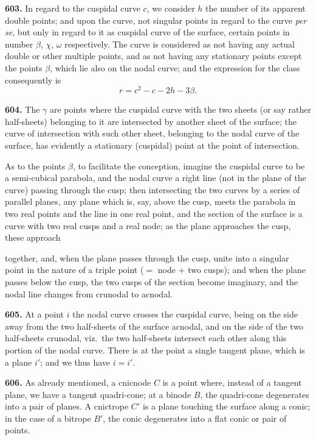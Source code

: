 \documentclass[11pt,a4paper]{article}
\newcommand{\artno}[1]{\textbf{#1.}\quad}
\begin{document}
\medskip

\artno{603} In regard to the cuspidal curve $c$, we consider $h$ the number
of its apparent double points; and upon the curve, not singular points in
regard to the curve \emph{per se}, but only in regard to it as cuspidal curve
of the surface, certain points in number $\beta$, $\chi$, $\omega$
respectively. The curve is considered as not having any actual double or
other multiple points, and as not having any stationary points except the
points $\beta$, which lie also on the nodal curve; and the expression for the
class consequently is
\[
  r = c^{2} - c - 2h - 3\beta.
\]

\medskip

\artno{604} The $\gamma$ are points where the cuspidal curve with the two
sheets (or say rather half-sheets) belonging to it are intersected by another
sheet of the surface; the curve of intersection with such other sheet,
belonging to the nodal curve of the surface, has evidently a stationary
(cuspidal) point at the point of intersection.

As to the points $\beta$, to facilitate the conception, imagine the cuspidal
curve to be a semi-cubical parabola, and the nodal curve a right line (not in
the plane of the curve) passing through the cusp; then intersecting the two
curves by a series of parallel planes, any plane which is, say, above the
cusp, meets the parabola in two real points and the line in one real point,
and the section of the surface is a curve with two real cusps and a real
node; as the plane approaches the cusp, these approach

together, and, when the plane passes through the cusp, unite into a singular
point in the nature of a triple point ($=$ node $+$ two cusps); and when the
plane passes below the cusp, the two cusps of the section become imaginary,
and the nodal line changes from crunodal to acnodal.

\medskip

\artno{605} At a point $i$ the nodal curve crosses the cuspidal curve, being
on the side away from the two half-sheets of the surface acnodal, and on the
side of the two half-sheets crunodal, viz.\ the two half-sheets intersect
each other along this portion of the nodal curve.  There is at the point a
single tangent plane, which is a plane $i'$; and we thus have $i = i'$.

\medskip

\artno{606} As already mentioned, a cnicnode $C$ is a point where, instead of
a tangent plane, we have a tangent quadri-cone; at a binode $B$, the
quadri-cone degenerates into a pair of planes.  A cnictrope $C'$ is a plane
touching the surface along a conic; in the case of a bitrope $B'$, the conic
degenerates into a flat conic or pair of points.
\end{document}
